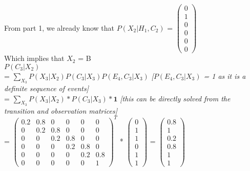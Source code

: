 \documentclass{article}
\begin{document}
\noindent
From part 1, we already know that $P(X_2 \vert H_1, C_2)$ 
= $\left(\begin{array}{c} 
        0 \\
        1 \\ 
        0 \\
        0 \\
        0 \\
        0
    \end{array}\right)$ \\ 

\noindent
Which implies that $X_2$ = B \\ 

\noindent
$P(C_3 \vert X_2)$ \\

\indent 
= $\sum_{X_3} P(X_3 \vert X_2) P(C_3 \vert X_3) P(E_4, C_3 \vert X_3)$  \textit{[$P(E_4, C_3 \vert X_3)$ = 1 as it is a definite sequence of events]} \\ 

\indent 
= $\sum_{X_3} P(X_3 \vert X_2) * P(C_3 \vert X_3) * \textbf{1}$ \textit{[this can be directly solved from the transition and observation matrices]} \\ 

\indent 
= $\left(\begin{array}{cccccc} 
        0.2 & 0.8 & 0 & 0 & 0 & 0 \\ 
        0 & 0.2 & 0.8 & 0 & 0 & 0 \\ 
        0 & 0 & 0.2 & 0.8 & 0 & 0 \\ 
        0 & 0 & 0 & 0.2 & 0.8 & 0 \\ 
        0 & 0 & 0 & 0 & 0.2 & 0.8 \\ 
        0 & 0 & 0 & 0 & 0 & 1
    \end{array}\right)^T$ * 
$\left(\begin{array}{c} 
        0 \\
        1 \\ 
        1 \\
        0 \\
        1 \\
        1
    \end{array}\right)$ 
= $\left(\begin{array}{c} 
        0.8 \\
        1 \\ 
        0.2 \\
        0.8 \\
        1 \\
        1
    \end{array}\right)$ \\ 
\\ 
\end{document}
